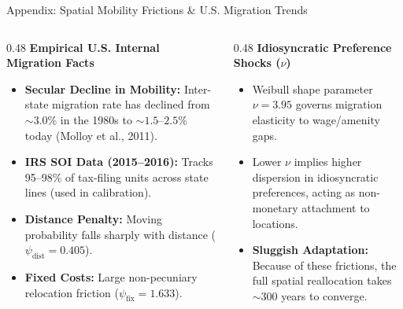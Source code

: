 \documentclass[aspectratio=169, 10pt]{beamer}
\begin{document}
\begin{frame}{Appendix: Spatial Mobility Frictions \& U.S. Migration Trends \hfill \hyperlink{main:environment}{\scriptsize{}}}\label{backup:migration_frictions}
    \begin{columns}[T]
        \begin{column}{0.48\textwidth}
            \textbf{\small Empirical U.S. Internal Migration Facts}
            \vspace{0.05cm}
            \begin{itemize}\scriptsize\setlength{\itemsep}{2pt}
                \item \textbf{Secular Decline in Mobility:} Inter-state migration rate has declined from $\sim 3.0\%$ in the 1980s to $\sim 1.5\text{--}2.5\%$ today (Molloy et al., 2011).
                \item \textbf{IRS SOI Data (2015--2016):} Tracks 95--98\% of tax-filing units across state lines (used in calibration).
                \item \textbf{Distance Penalty:} Moving probability falls sharply with distance ($\psi_{\text{dist}} = 0.405$).
                \item \textbf{Fixed Costs:} Large non-pecuniary relocation friction ($\psi_{\text{fix}} = 1.633$).
            \end{itemize}
        \end{column}
        
        \begin{column}{0.48\textwidth}
            \textbf{\small Idiosyncratic Preference Shocks ($\nu$)}
            \vspace{0.05cm}
            \begin{itemize}\scriptsize\setlength{\itemsep}{2pt}
                \item Weibull shape parameter $\nu = 3.95$ governs migration elasticity to wage/amenity gaps.
                \item Lower $\nu$ implies higher dispersion in idiosyncratic preferences, acting as non-monetary attachment to locations.
                \item \textbf{Sluggish Adaptation:} Because of these frictions, the full spatial reallocation takes $\sim 300$ years to converge.
            \end{itemize}
        \end{column}
    \end{columns}
\end{frame}
\end{document}
